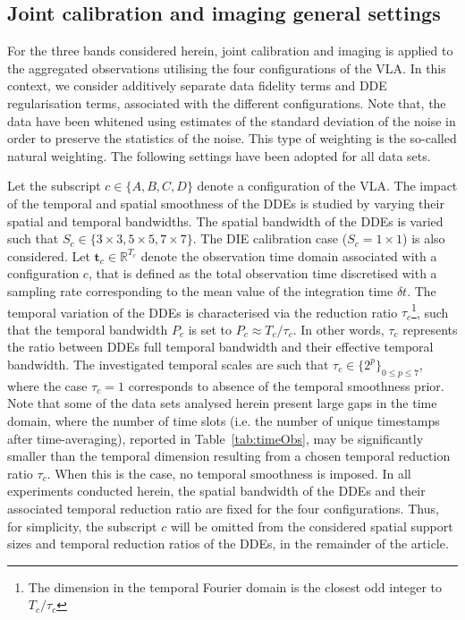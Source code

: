 \documentclass[fleqn,usenatbib]{mnras}
\newcommand{\eR}{\mathbb{R}}
\begin{document}
\subsection{Joint calibration and imaging general settings}\label{ssec:settings}
For the three bands considered herein, joint calibration and imaging is applied to the aggregated observations 
utilising the four configurations of the {{VLA}}. In this context, we consider additively separate data fidelity terms and DDE regularisation terms, associated with the different
configurations. Note that, the data have been whitened using estimates of the standard deviation of the noise in order to preserve the statistics of the noise. This type of weighting is the so-called natural weighting. The following settings have been adopted for all data sets.

Let the subscript $ c \in\{A,B,C,D\}$ denote a configuration of the {{VLA}}. The impact of the temporal and spatial smoothness of the DDEs is studied by varying their spatial and temporal bandwidths. The spatial bandwidth of the DDEs is varied such that $S_c\in \{ 3\times3, 5\times5, 7\times7\}$. The DIE calibration case ($S_c=1\times1$) is also considered. Let $\mathbf{t}_c \in \eR^{T_c}$ denote the observation time domain associated with a configuration $c$, that is defined as the total observation time discretised with a sampling rate corresponding to the mean value of the integration time $\delta t$. 
The temporal variation of the DDEs is characterised via the reduction ratio $\tau_c$\footnote{The dimension in the temporal Fourier domain is the closest odd integer to $ T_c/\tau_c $}, such that the temporal bandwidth $P_c$ is set to $P_c\approx T_c/\tau_c $. In other words, $\tau_c$ represents the ratio between DDEs full temporal bandwidth and their effective temporal bandwidth. The investigated temporal scales are such that $\tau_c \in\{ 2^p\}_{0\leq p \leq7}$, where the case $\tau_c =1$ corresponds to absence of the temporal smoothness prior. Note that some of the data sets analysed herein present large gaps in the time domain, where the number of time slots (i.e. the number of
unique timestamps after time-averaging), reported in Table~\ref{tab:timeObs}, may be significantly smaller than the temporal dimension resulting from a chosen temporal reduction ratio $\tau_c$. When this is the case, no temporal smoothness is imposed.
In all experiments conducted herein, the spatial bandwidth of the DDEs and their associated temporal reduction ratio are fixed for the four configurations. Thus, for simplicity, the subscript $c$ will be omitted from the considered spatial support sizes and temporal reduction ratios of the DDEs, in the remainder of the article.
\end{document}
